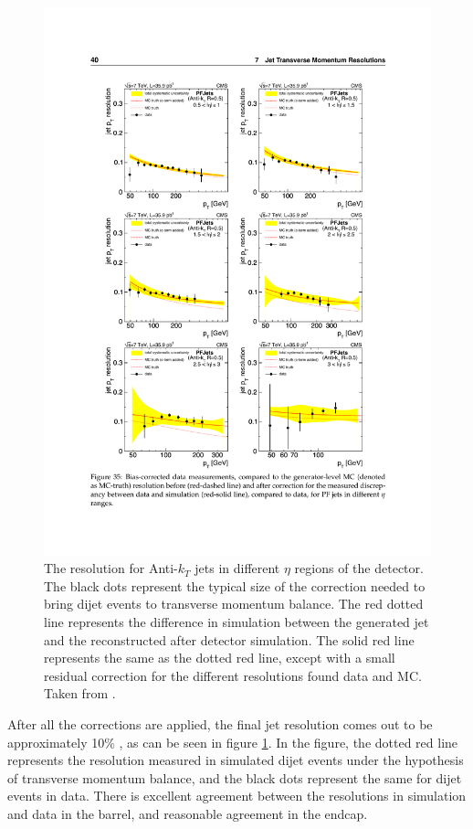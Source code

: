     \begin{figure}[!h]
      \centering
      \includegraphics[width=.8\textwidth]{figures/jet_resolution.pdf}
      \caption[The \pt resolution for Anti-$k_T$ jets in different $\eta$ regions of the detector.]{The \pt resolution for Anti-$k_T$ jets in different $\eta$ regions of the detector. The black dots represent the typical size of the correction needed to bring dijet events to transverse momentum balance. The red dotted line represents the difference in simulation between the generated jet \pt and the \pt reconstructed after detector simulation. The solid red line represents the same as the dotted red line, except with a small residual correction for the different resolutions found data and MC. Taken from \cite{jetmet_2011}.}
      \label{fig:jet_resolution}
    \end{figure}

    After all the corrections are applied, the final jet \pt resolution comes out to be approximately 10\% \cite[sec 7.2]{jetmet_2011}, as can be seen in figure \ref{fig:jet_resolution}. In the figure, the dotted red line represents the \pt resolution measured in simulated dijet events under the hypothesis of transverse momentum balance, and the black dots represent the same for dijet events in data. There is excellent agreement between the resolutions in simulation and data in the barrel, and reasonable agreement in the endcap.

